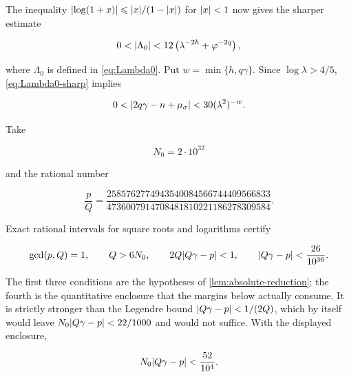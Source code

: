 The inequality $\lvert\log(1+x)\rvert\leqslant\lvert x\rvert/(1-\lvert x\rvert)$ for
$\lvert x\rvert<1$ now gives the sharper estimate

\begin{equation}
 0<\lvert\Lambda_0\rvert
 <12\left(\lambda^{-2h}+\varphi^{-2q}\right),
 \label{eq:Lambda0-sharp}
\end{equation}

where $\Lambda_0$ is defined in \cref{eq:Lambda0}. Put
$w=\min\{h,q\gamma\}$. Since $\log\lambda>4/5$,
\cref{eq:Lambda0-sharp} implies

\begin{equation}
 0<\lvert2q\gamma-n+\mu_\sigma\rvert
 <30(\lambda^2)^{-w}.
 \label{eq:fixed-reduction-form}
\end{equation}

Take

\begin{equation}
 N_0=2\mathbin{\cdot}10^{32}
 \label{eq:M0}
\end{equation}

and the rational number

\begin{equation}
 \frac pQ
 =\frac{2585762774943540084566744409566833}
 {4736007914708481810221186278309584}.
 \label{eq:common-convergent}
\end{equation}

Exact rational intervals for square roots and logarithms certify

\begin{equation}
 \gcd(p,Q)=1,
 \qquad
 Q>6N_0,
 \qquad
 2Q\lvert Q\gamma-p\rvert<1,
 \qquad
 \lvert Q\gamma-p\rvert<\frac{26}{10^{36}}.
 \label{eq:convergent-certificate}
\end{equation}

The first three conditions are the hypotheses of
\cref{lem:absolute-reduction}; the fourth is the quantitative enclosure that
the margins below actually consume. It is strictly stronger than the
Legendre bound $\lvert Q\gamma-p\rvert<1/(2Q)$, which by itself would leave
$N_0\lvert Q\gamma-p\rvert<22/1000$ and would not suffice. With the displayed
enclosure,

\begin{equation}
 N_0\lvert Q\gamma-p\rvert<\frac{52}{10^4}.
 \label{eq:convergent-error-scaled}
\end{equation}

